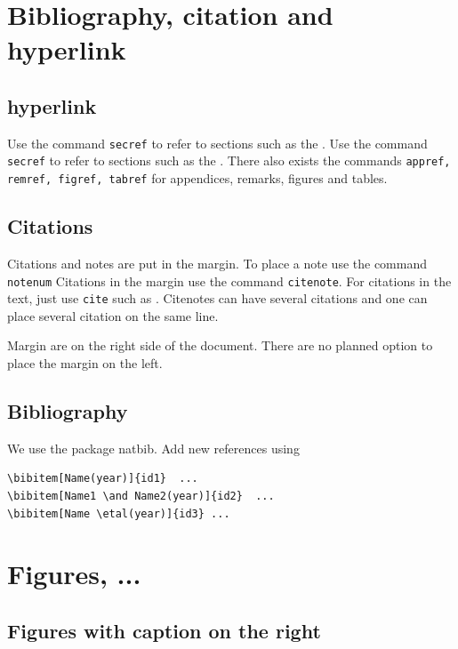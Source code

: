 \section{Bibliography, citation and hyperlink}

\subsection{hyperlink}

Use the command \texttt{secref} to refer to sections such as the . Use the command \texttt{secref} to refer to sections such as the . There also exists the commands \texttt{appref, remref, figref, tabref} for appendices, remarks, figures and tables.

\subsection{Citations}

Citations and notes are put in the margin. To place a note use the command  \texttt{notenum} Citations in the margin use the command \texttt{citenote}. For citations in the text, just use \texttt{cite} such as \cite{lan46}. Citenotes can have several citations and one can place several citation on the same line.

\begin{remark}[Margins]
Margin are on the right side of the document. There are no planned option to place the margin on the left.
\end{remark}

\subsection{Bibliography}

We use the package natbib. Add new references using
\begin{verbatim}
\bibitem[Name(year)]{id1}  ...
\bibitem[Name1 \and Name2(year)]{id2}  ...
\bibitem[Name \etal(year)]{id3} ...
\end{verbatim} 

\section{Figures, ...}

\subsection{Figures with caption on the right}

